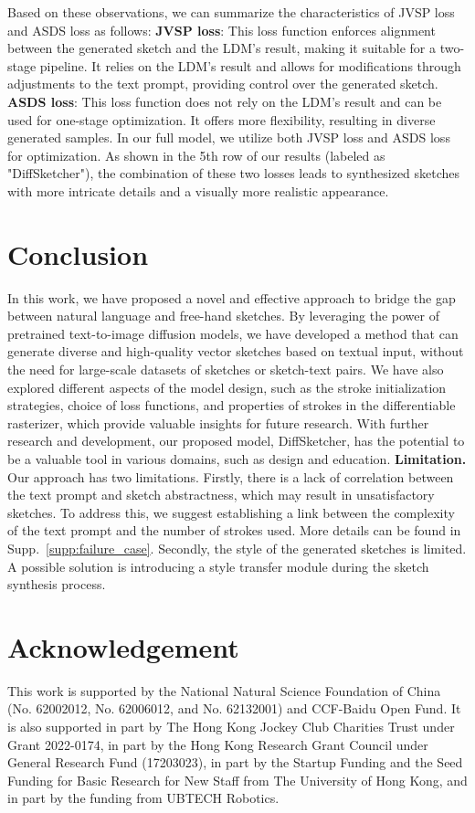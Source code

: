 \documentclass{article}
\begin{document}
Based on these observations, we can summarize the characteristics of JVSP loss and ASDS loss as follows: \textbf{JVSP loss}: This loss function enforces alignment between the generated sketch and the LDM's result, making it suitable for a two-stage pipeline. It relies on the LDM's result and allows for modifications through adjustments to the text prompt, providing control over the generated sketch.
\textbf{ASDS loss}: This loss function does not rely on the LDM's result and can be used for one-stage optimization. It offers more flexibility, resulting in diverse generated samples. In our full model, we utilize both JVSP loss and ASDS loss for optimization. As shown in the 5th row of our results (labeled as "DiffSketcher"), the combination of these two losses leads to synthesized sketches with more intricate details and a visually more realistic appearance.

\section{Conclusion}
In this work, we have proposed a novel and effective approach to bridge the gap between natural language and free-hand sketches. By leveraging the power of pretrained text-to-image diffusion models, we have developed a method that can generate diverse and high-quality vector sketches based on textual input, without the need for large-scale datasets of sketches or sketch-text pairs.
We have also explored different aspects of the model design, such as the stroke initialization strategies, choice of loss functions, and properties of strokes in the differentiable rasterizer, which provide valuable insights for future research.
With further research and development, our proposed model, DiffSketcher, has the potential to be a valuable tool in various domains, such as design and education.
\noindent\textbf{Limitation.} \quad
Our approach has two limitations. Firstly, there is a lack of correlation between the text prompt and sketch abstractness, which may result in unsatisfactory sketches. To address this, we suggest establishing a link between the complexity of the text prompt and the number of strokes used. More details can be found in Supp.~\ref{supp:failure_case}. Secondly, the style of the generated sketches is limited. A possible solution is introducing a style transfer module during the sketch synthesis process.

\section{Acknowledgement}
This work is supported by the National Natural Science Foundation of China (No. 62002012, No. 62006012, and No. 62132001) and CCF-Baidu Open Fund. It is also supported in part by The Hong Kong Jockey Club Charities Trust under Grant 2022-0174, in part by the Hong Kong Research Grant Council under General Research Fund (17203023), in part by the Startup Funding and the Seed Funding for Basic Research for New Staff from The University of Hong Kong, and in part by the funding from UBTECH Robotics. 
\end{document}
